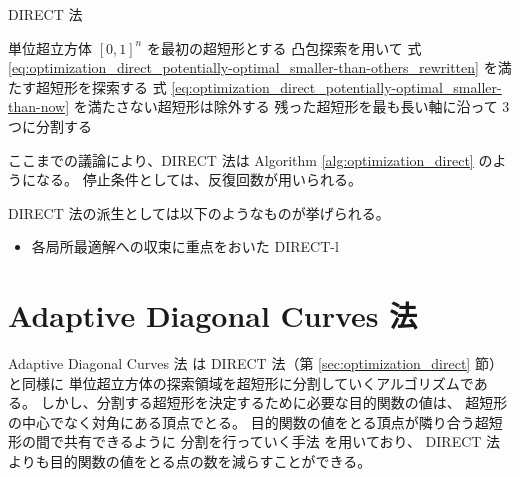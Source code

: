 \begin{algorithm}[tp]
    \caption{DIRECT 法}
    \label{alg:optimization_direct}
    \begin{algorithmic}
            \State 単位超立方体 $[0, 1]^n$ を最初の超短形とする
            \Loop
                \State 凸包探索を用いて
                    式 \eqref{eq:optimization_direct_potentially-optimal_smaller-than-others_rewritten}
                    を満たす超短形を探索する
                \State 式 \eqref{eq:optimization_direct_potentially-optimal_smaller-than-now}
                    を満たさない超短形は除外する
                \State 残った超短形を最も長い軸に沿って 3 つに分割する
                    \State \Return
                \EndIf
            \EndLoop
        \EndProcedure
    \end{algorithmic}
\end{algorithm}

ここまでの議論により、DIRECT 法は
Algorithm \ref{alg:optimization_direct} のようになる。
停止条件としては、反復回数が用いられる。

DIRECT 法の派生としては以下のようなものが挙げられる。

\begin{itemize}
    \item 各局所最適解への収束に重点をおいた DIRECT-l \cite{Gablonsky2001}
\end{itemize}

\section{Adaptive Diagonal Curves 法}

Adaptive Diagonal Curves 法 \cite{Sergeyev2006} は
DIRECT 法（第 \ref{sec:optimization_direct} 節）と同様に
単位超立方体の探索領域を超短形に分割していくアルゴリズムである。
しかし、分割する超短形を決定するために必要な目的関数の値は、
超短形の中心でなく対角にある頂点でとる。
目的関数の値をとる頂点が隣り合う超短形の間で共有できるように
分割を行っていく手法 \cite{Sergeyev2000} を用いており、
DIRECT 法よりも目的関数の値をとる点の数を減らすことができる。

